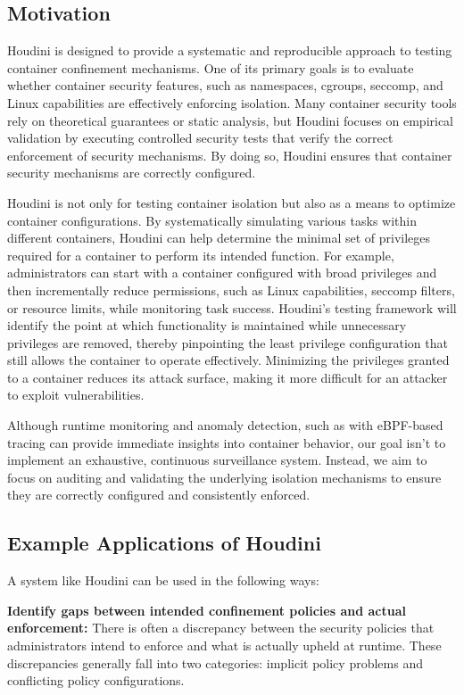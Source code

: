 \documentclass[12pt]{report}
\begin{document}
\begin{doublespace}
\section{Motivation}

Houdini is designed to provide a systematic and reproducible approach to testing container confinement mechanisms. One of its primary goals is to evaluate whether container security features, such as namespaces, cgroups, seccomp, and Linux capabilities are effectively enforcing isolation. Many container security tools rely on theoretical guarantees or static analysis\cite{clair}, but Houdini focuses on empirical validation by executing controlled security tests that verify the correct enforcement of security mechanisms. By doing so, Houdini ensures that container security mechanisms are correctly configured.

Houdini is not only for testing container isolation but also as a means to optimize container configurations. By systematically simulating various tasks within different containers, Houdini can help determine the minimal set of privileges required for a container to perform its intended function. For example, administrators can start with a container configured with broad privileges and then incrementally reduce permissions, such as Linux capabilities, seccomp filters, or resource limits, while monitoring task success. Houdini’s testing framework will identify the point at which functionality is maintained while unnecessary privileges are removed, thereby pinpointing the least privilege configuration that still allows the container to operate effectively. Minimizing the privileges granted to a container reduces its attack surface, making it more difficult for an attacker to exploit vulnerabilities.

Although runtime monitoring and anomaly detection, such as with eBPF-based tracing\cite{findlay2021bpfcontain} can provide immediate insights into container behavior, our goal isn't to implement an exhaustive, continuous surveillance system. Instead, we aim to focus on auditing and validating the underlying isolation mechanisms to ensure they are correctly configured and consistently enforced.

\subsection{Example Applications of Houdini}
A system like Houdini can be used in the following ways: 

\noindent\textbf{Identify gaps between intended confinement policies and actual enforcement:}
There is often a discrepancy between the security policies that administrators intend to enforce and what is actually upheld at runtime. These discrepancies generally fall into two categories: implicit policy problems and conflicting policy configurations.


\end{doublespace}
\end{document}

